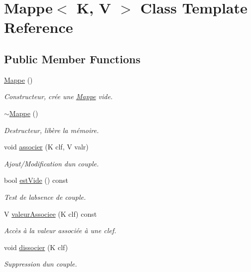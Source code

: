 \hypertarget{class_mappe}{}\section{Mappe$<$ K, V $>$ Class Template Reference}
\label{class_mappe}
\subsection*{Public Member Functions}
\begin{DoxyCompactItemize}
\item 
\hyperlink{class_mappe_a44cd4d952786b33abd6d16fde9c832ae}{Mappe} ()
\begin{DoxyCompactList}\small\item\em Constructeur, crée une \hyperlink{class_mappe}{Mappe} vide. \end{DoxyCompactList}\item 
\hyperlink{class_mappe_af0021fa8eec4be985806f56f9fd4fbd1}{$\sim$\+Mappe} ()
\begin{DoxyCompactList}\small\item\em Destructeur, libère la mémoire. \end{DoxyCompactList}\item 
void \hyperlink{class_mappe_ad11c730e4adbe884e4bad8e18103fa36}{associer} (K clf, V valr)
\begin{DoxyCompactList}\small\item\em Ajout/\+Modification d\textquotesingle{}un couple. \end{DoxyCompactList}\item 
bool \hyperlink{class_mappe_a15f2881d3d6e6c41b433c7b9b5dbb6b0}{est\+Vide} () const 
\begin{DoxyCompactList}\small\item\em Test de l\textquotesingle{}absence de couple. \end{DoxyCompactList}\item 
V \hyperlink{class_mappe_a6c2ff69dc18c04a577f0d4c49a37a03a}{valeur\+Associee} (K clf) const 
\begin{DoxyCompactList}\small\item\em Accès à la valeur associée à une clef. \end{DoxyCompactList}\item 
void \hyperlink{class_mappe_ae98a4839efd01b81a274febbad6fcbd1}{dissocier} (K clf)
\begin{DoxyCompactList}\small\item\em Suppression d\textquotesingle{}un couple. \end{DoxyCompactList}\item 

\end{DoxyCompactItemize}
